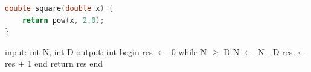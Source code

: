 \begin{lstlisting}[language=C,caption={Sed fermentum vel eros ut malesuada. 
   Aenean at venenatis neque. Aliquam eu magna nec elit pellentesque laoreet 
   sed vitae eros. Proin ac blandit felis. Integer molestie dolor eget metus 
   laoreet, sed euismod est consequat. Morbi vel lacus gravida justo vulputate 
   euismod. Nam vulputate mauris non odio consectetur, vitae cursus 
   massa faucibus.}]
double square(double x) {
    return pow(x, 2.0);
}
\end{lstlisting}

\lipsum[1] \cite{latex2e}

\begin{algorithm}[caption={Integer division.}, label={alg1}]
 input: int N, int D
 output: int
 begin
   res $\gets$ 0
   while N $\geq$ D 
     N $\gets$ N - D
     res $\gets$ res + 1      
   end
   return res
 end       
\end{algorithm}

\lipsum[1] \cite{knuth:1984,lesk:1977}

\printbibliography



